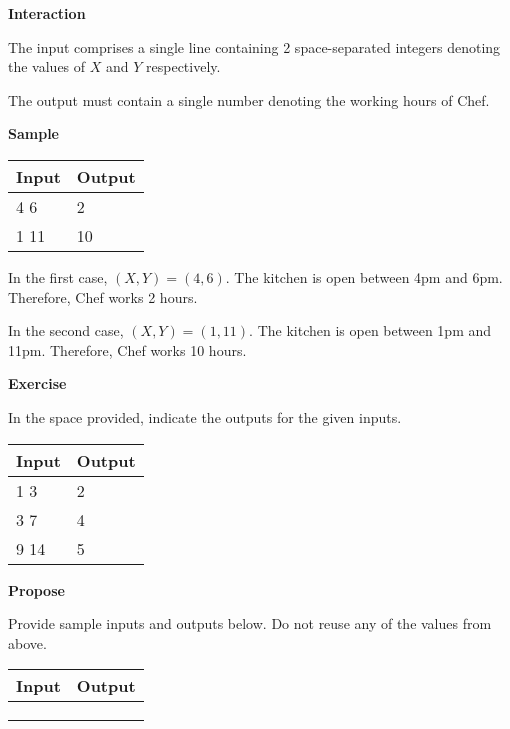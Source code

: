 \documentclass[a4paper]{exam}
\newcommand\heading[1]{\textbf{#1}}
\begin{document}
\begin{questions}
    \heading{Interaction}

    The input comprises a single line containing 2 space-separated integers denoting the values of $X$ and $Y$ respectively.

    The output must contain a single number denoting the working hours of Chef.

    \heading{Sample}

    \begin{tabularx}{\textwidth}{|X|X|}
        \rowcolor{gray!50}
        \hline
        Input & Output \\ \hline\hline
        4 6   & 2      \\\hline
        1 11  & 10     \\\hline
    \end{tabularx}

    In the first case, $(X,Y)=(4,6)$. The kitchen is open between 4pm and 6pm. Therefore, Chef works 2 hours.

    In the second case, $(X,Y)=(1,11)$. The kitchen is open between 1pm and 11pm. Therefore, Chef works 10 hours.

    \heading{Exercise}

    In the space provided, indicate the outputs for the given inputs.

    \begin{tabularx}{\textwidth}{|X|X|}
        \rowcolor{gray!50}
        \hline
        Input & Output \\ \hline\hline
        1 3   & 2      \\\hline
        3 7   & 4      \\\hline
        9 14  & 5      \\\hline
    \end{tabularx}

    \heading{Propose}

    Provide sample inputs and outputs below. Do not reuse any of the values from above.

    \begin{tabularx}{\textwidth}{|X|X|}
        \rowcolor{gray!50}
        \hline
        Input & Output \\ \hline\hline
              &        \\\hline
              &        \\\hline
              &        \\\hline
    \end{tabularx}


\end{questions}
\end{document}
